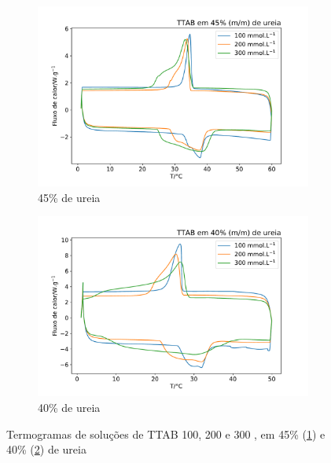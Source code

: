 		\begin{figure}[H]
			\centering
			\begin{subfigure}[t]{0.45\textwidth}
				\includegraphics[width=\textwidth]{./imagens/dsc/TTAB_45p}
				\caption{45\% de ureia}
				\label{fig:DSC_TTAB_UR45}
			\end{subfigure} \qquad %
			\begin{subfigure}[t]{0.45\textwidth}
				\includegraphics[width=\textwidth]{./imagens/dsc/TTAB_40p}
				\caption{40\% de ureia}
				\label{fig:DSC_TTAB_UR40}
			\end{subfigure}
			\caption{Termogramas de soluções de TTAB 100, 200 e 300 \mM{}, em 45\% (\ref{fig:DSC_TTAB_UR45}) e 40\% (\ref{fig:DSC_TTAB_UR40}) de ureia}
			\label{fig:DSC_TTAB_UR_40-45}
		\end{figure}
		
